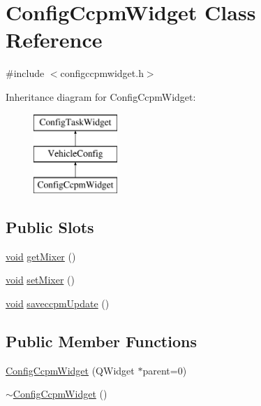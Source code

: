 \hypertarget{class_config_ccpm_widget}{\section{\-Config\-Ccpm\-Widget \-Class \-Reference}
\label{class_config_ccpm_widget}
}


{\ttfamily \#include $<$configccpmwidget.\-h$>$}

\-Inheritance diagram for \-Config\-Ccpm\-Widget\-:\begin{figure}[H]
\begin{center}
\leavevmode
\includegraphics[height=3.000000cm]{class_config_ccpm_widget}
\end{center}
\end{figure}
\subsection*{\-Public \-Slots}
\begin{DoxyCompactItemize}
\item 
\hyperlink{group___u_a_v_objects_plugin_ga444cf2ff3f0ecbe028adce838d373f5c}{void} \hyperlink{group___config_plugin_ga655f5771884dcc4da79423c9f233ccca}{get\-Mixer} ()
\item 
\hyperlink{group___u_a_v_objects_plugin_ga444cf2ff3f0ecbe028adce838d373f5c}{void} \hyperlink{group___config_plugin_gabc1d25c95203b38337f954ed47387039}{set\-Mixer} ()
\item 
\hyperlink{group___u_a_v_objects_plugin_ga444cf2ff3f0ecbe028adce838d373f5c}{void} \hyperlink{group___config_plugin_ga58b70d2303d5485482abdd35f2f49c15}{saveccpm\-Update} ()
\end{DoxyCompactItemize}
\subsection*{\-Public \-Member \-Functions}
\begin{DoxyCompactItemize}
\item 
\hyperlink{group___config_plugin_gad02f1999c6fe879b07303698416ff782}{\-Config\-Ccpm\-Widget} (\-Q\-Widget $\ast$parent=0)
\item 
\hyperlink{group___config_plugin_ga1c115c3e78572da9895bc485b6ed507e}{$\sim$\-Config\-Ccpm\-Widget} ()
\end{DoxyCompactItemize}
